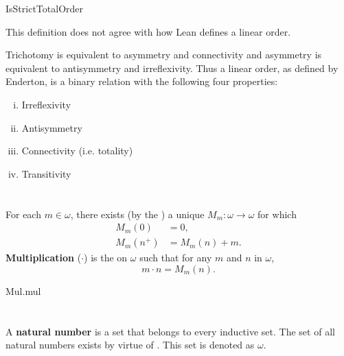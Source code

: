 \documentclass{report}
\begin{document}
    {IsStrictTotalOrder}

  \begin{note}
    This definition does not agree with how Lean defines a linear order.

    \vspace{6pt}
    Trichotomy is equivalent to asymmetry and connectivity and asymmetry is
      equivalent to antisymmetry and irreflexivity.
    Thus a linear order, as defined by Enderton, is a binary relation with the
      following four properties:

    \vspace{6pt}
    \begin{enumerate}[(i)]
      \item Irreflexivity
      \item Antisymmetry
      \item Connectivity (i.e. totality)
      \item Transitivity
    \end{enumerate}
  \end{note}

\section{}%

  For each $m \in \omega$, there exists (by the
    ) a unique
     $M_m \colon \omega \rightarrow \omega$ for which
    \begin{align*}
      M_m(0) & = 0, \\
      M_m(n^+) & = M_m(n) + m.
    \end{align*}
  \textbf{Multiplication} ($\cdot$) is the  on
    $\omega$ such that for any $m$ and $n$ in $\omega$, $$m \cdot n = M_m(n).$$

    {Mul.mul}

\section{}%

  A \textbf{natural number} is a set that belongs to every inductive set.
  The set of all natural numbers exists by virtue of .
  This set is denoted as $\omega$.
\end{document}
